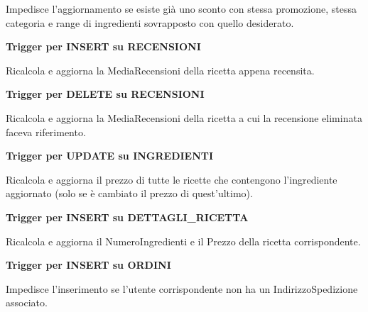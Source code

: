 Impedisce l'aggiornamento se esiste già uno sconto con stessa promozione, stessa categoria e range di ingredienti sovrapposto con quello desiderato.



\vspace{3em}
\textbf{Trigger per INSERT su RECENSIONI}

Ricalcola e aggiorna la MediaRecensioni della ricetta appena recensita.



\vspace{3em}
\textbf{Trigger per DELETE su RECENSIONI}

Ricalcola e aggiorna la MediaRecensioni della ricetta a cui la recensione eliminata faceva riferimento.



\vspace{3em}
\textbf{Trigger per UPDATE su INGREDIENTI}

Ricalcola e aggiorna il prezzo di tutte le ricette che contengono l'ingrediente aggiornato (solo se è cambiato il prezzo di quest'ultimo).



\vspace{3em}
\textbf{Trigger per INSERT su DETTAGLI\_RICETTA}

Ricalcola e aggiorna il NumeroIngredienti e il Prezzo della ricetta corrispondente.



\vspace{3em}
\textbf{Trigger per INSERT su ORDINI}

Impedisce l'inserimento se l'utente corrispondente non ha un IndirizzoSpedizione associato.

